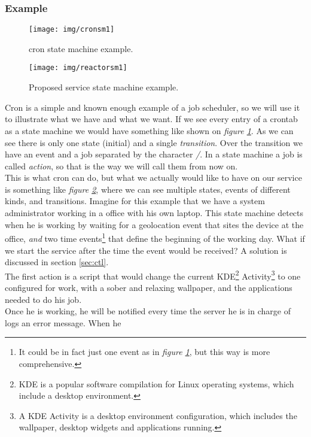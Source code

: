 \documentclass[a4paper,11pt]{article}
\begin{document}
\subsubsection{Example}
\begin{figure}
  \centering
    \texttt{[image: img/cronsm1]}
  \caption{cron state machine example.}
  \label{fig:cronsm1}
\end{figure}
\begin{figure}
  \centering
    \texttt{[image: img/reactorsm1]}
  \caption{Proposed service state machine example.}
  \label{fig:reactorsm1}
\end{figure}
Cron is a simple and known enough example of a job scheduler, so we will
use it to illustrate what we have and what we want. If we see every entry of a 
crontab as a state machine we would have something like shown on \emph{figure \ref{fig:cronsm1}}.
As we can see there is only one state (initial) and a single \emph{transition}. Over the transition we have an
event and a job separated by the character \emph{/}. In a state machine a job is called \emph{action}, so that is
the way we will call them from now on.\\
This is what cron can do, but what we actually would like to have on our service is something like 
\emph{figure \ref{fig:reactorsm1}}, where we can see multiple states, events of different kinds,
and transitions. Imagine for this example that we have a system administrator working in a office with his own 
laptop. This state machine detects when he is working by waiting for a geolocation event that sites
the device at the office, \emph{and} two time events\footnote{It could be in fact just one event as in 
\emph{figure \ref{fig:cronsm1}}, but this way is more comprehensive.} that define the beginning
of the working day. What if we start the service after the time the event would be received? A solution 
is discussed in section \ref{sec:ctl}.\\
The first action is a script that would change the current KDE\footnote{KDE is a popular software compilation for 
Linux operating systems, which include a desktop environment.} Activity\footnote{A KDE Activity is a desktop 
environment configuration, which includes the wallpaper, desktop widgets and applications running.} to one 
configured for work, with a sober and relaxing wallpaper, and the applications needed to do his job.\\
Once he is working, he will be notified every time the server he is in charge of logs an error message. When he
\end{document}

